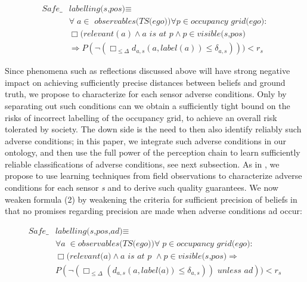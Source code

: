 \begin{align}\label{eq:safelabelling(s,pos)}
    \textit{Safe}\_&\textit{labelling(s,pos)} \equiv 					\\		
 & \forall a\in\textit{ observables(TS(ego))}\forall p \in \textit{occupancy grid(ego)}:\nonumber\\  
& \Box (\textit{relevant}(a) \land a \textit{ is at } p\land p\in \textit{visible(s,pos)} \nonumber\\
& \Rightarrow P(\neg( \Box_{\leq\Delta} d_{a,s}(a,\textit{label}(a))\leq\delta_{a,s}))) < r_s\nonumber
\end{align}

Since phenomena such as reflections discussed above will have strong negative impact on achieving sufficiently precise distances between beliefs and ground truth, we propose to characterize for each sensor adverse conditions. Only by separating out such conditions can we obtain a sufficiently tight bound on the risks of incorrect labelling of the occupancy grid, to achieve an overall risk tolerated by society. The down side is the need to then also identify reliably such adverse conditions; in this paper, we integrate such adverse conditions in our ontology, and then use the full power of the perception chain to learn sufficiently reliable classifications of adverse conditions, see next subsection. As in \cite{galbas}, we propose to use learning techniques from field observations to characterize adverse conditions for each sensor \textit{s} and to derive such quality guarantees. We now weaken formula (2) by weakening the criteria for sufficient precision of beliefs in that no promises regarding precision are made when adverse conditions ad occur:

\begin{align}\label{eq:safelabelling(s,pos,ad)}
\textit{Safe}\_&\textit{labelling(s,pos,ad)} \equiv\\  			
&\forall a\in \textit{observables(TS(ego))}\forall p\in\textit{occupancy grid(ego)}\nonumber:\\
&\Box(\textit{relevant(a)} \land a\textit{ is at p }\land p\in\textit{visible(s,pos)} \Rightarrow\nonumber\\
&P(\neg(\Box_{\leq\Delta} (d_{a,s}(a, \textit{label(a)})\leq \delta_{a,s}))\textit{ unless } ad)) < r_s\nonumber
\end{align}

